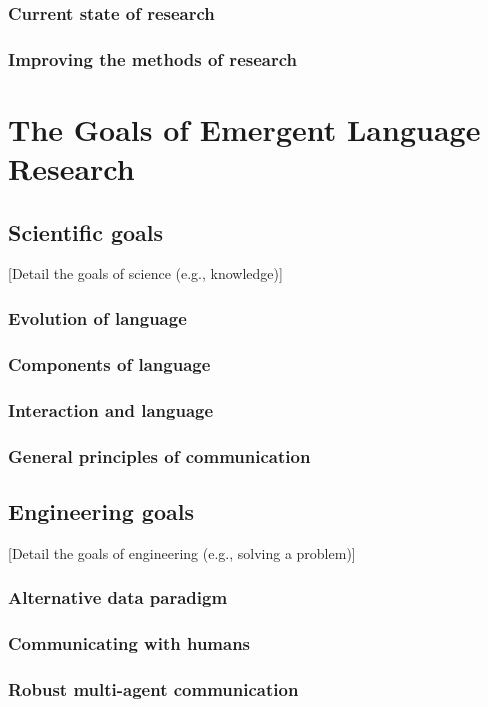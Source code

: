 \documentclass[letterpaper]{report}
\newcommand\cmg[1]{{\color{gray}[#1]}}
\begin{document}
\subsection{Current state of research}

\subsection{Improving the methods of research}


\chapter{The Goals of Emergent Language Research}\label{sec:goals}
\section{Scientific goals}
\cmg{Detail the goals of science (e.g., knowledge)}
\subsection{Evolution of language}
\subsection{Components of language}
\subsection{Interaction and language}
\subsection{General principles of communication}
\section{Engineering goals}
\cmg{Detail the goals of engineering (e.g., solving a problem)}
\subsection{Alternative data paradigm}
\subsection{Communicating with humans}
\subsection{Robust multi-agent communication}
\end{document}
